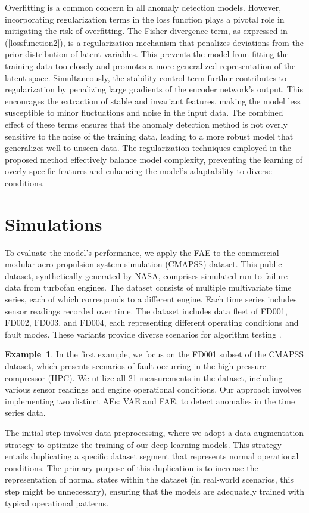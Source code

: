\documentclass[journal]{IEEEtran}
\begin{document}
Overfitting is a common concern in all anomaly detection models. However, incorporating regularization terms in the loss function plays a pivotal role in mitigating the risk of overfitting. The Fisher divergence term, as expressed in (\ref{lossfunction2}), is a regularization mechanism that penalizes deviations from the prior distribution of latent variables. This prevents the model from fitting the training data too closely and promotes a more generalized representation of the latent space. Simultaneously, the stability control term further contributes to regularization by penalizing large gradients of the encoder network's output. This encourages the extraction of stable and invariant features, making the model less susceptible to minor fluctuations and noise in the input data. The combined effect of these terms ensures that the anomaly detection method is not overly sensitive to the noise of the training data, leading to a more robust model that generalizes well to unseen data. The regularization techniques employed in the proposed method effectively balance model complexity, preventing the learning of overly specific features and enhancing the model's adaptability to diverse conditions.

\fi
\section{Simulations}
To evaluate the model's performance, we apply the FAE to the commercial modular aero propulsion system simulation (CMAPSS) dataset. This public dataset, synthetically generated by NASA, comprises simulated run-to-failure data from turbofan engines. The dataset consists of multiple multivariate time series, each of which corresponds to a different engine. Each time series includes sensor readings recorded over time. The dataset includes data fleet of FD001, FD002, FD003, and FD004, each representing different operating conditions and fault modes. These variants provide diverse scenarios for algorithm testing \cite{cmapss}.

\textbf{Example~1}. In the first example, we focus on the FD001 subset of the CMAPSS dataset, which presents scenarios of fault occurring in the high-pressure compressor (HPC). We utilize all 21 measurements in the dataset, including various sensor readings and engine operational conditions. Our approach involves implementing two distinct AEs: VAE and FAE, to detect anomalies in the time series data.

The initial step involves data preprocessing, where we adopt a data augmentation strategy to optimize the training of our deep learning models. This strategy entails duplicating a specific dataset segment that represents normal operational conditions. The primary purpose of this duplication is to increase the representation of normal states within the dataset (in real-world scenarios, this step might be unnecessary), ensuring that the models are adequately trained with typical operational patterns.
\end{document}
